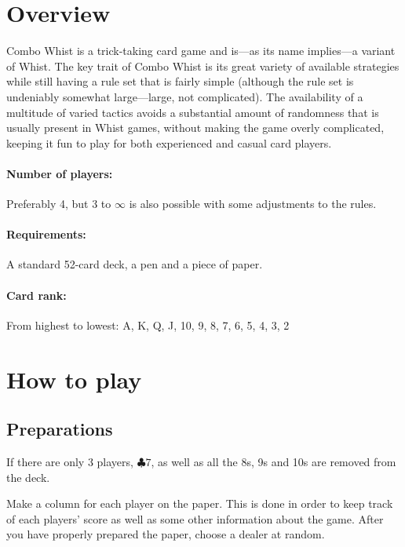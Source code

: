 \documentclass[a4paper]{article}
\author{By Joakim Nilsson}
\date{Development version (based on version \varVersion-\varLanguage)---\today}
\date{Version \varVersion-\varLanguage---\today}
\begin{document}

	\introPages
	\pagebreak


	\section{Overview}
		Combo Whist is a trick-taking card game and is---as its name implies---a variant of Whist. The key trait of Combo Whist is its great variety of available strategies while still having a rule set that is fairly simple (although the rule set is undeniably somewhat large---large, not complicated). The availability of a multitude of varied tactics avoids a substantial amount of randomness that is usually present in Whist games, without making the game overly complicated, keeping it fun to play for both experienced and casual card players.

		\paragraph{Number of players:}
			Preferably 4, but 3 to $\infty$ is also possible with some adjustments to the rules.

		\paragraph{Requirements:}
			A standard 52-card deck, a pen and a piece of paper.

		\paragraph{Card rank:}
			From highest to lowest: A, K, Q, J, 10, 9, 8, 7, 6, 5, 4, 3, 2

	\section{How to play}
		\subsection{Preparations}
			If there are only 3 players, $\clubsuit 7$, as well as all the 8s, 9s and 10s are removed from the deck.

			Make a column for each player on the paper. This is done in order to keep track of each players' score as well as some other information about the game. After you have properly prepared the paper, choose a dealer at random.
\end{document}
